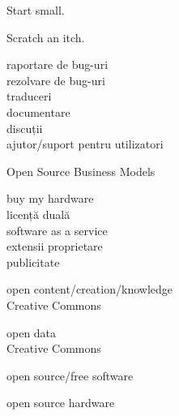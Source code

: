 \documentclass{beamer}
\begin{document}
\begin{frame}{}
  \Large
  \begin{center}
    Start small.
  \end{center}
\end{frame}

\begin{frame}{}
  \Large
  \begin{center}
    Scratch an itch.
  \end{center}
\end{frame}

\begin{frame}{}
  \Large
  \begin{center}
    raportare de bug-uri \\
    rezolvare de bug-uri \\
    traduceri \\
    documentare \\
    discuții \\
    ajutor/suport pentru utilizatori
  \end{center}
\end{frame}

\begin{frame}{Open Source Business Models}
  \Large
  \begin{center}
    buy my hardware \\
    licență duală \\
    software as a service \\
    extensii proprietare \\
    publicitate
  \end{center}
\end{frame}

\begin{frame}{}
  \Large
  \begin{center}
    open content/creation/knowledge \\
    Creative Commons
  \end{center}
\end{frame}

\begin{frame}{}
  \Large
  \begin{center}
    open data \\
    Creative Commons
  \end{center}
\end{frame}

\begin{frame}{}
  \Large
  \begin{center}
    open source/free software
  \end{center}
\end{frame}

\begin{frame}{}
  \Large
  \begin{center}
    open source hardware
  \end{center}
\end{frame}

\frame{\titlepage}
\end{document}
